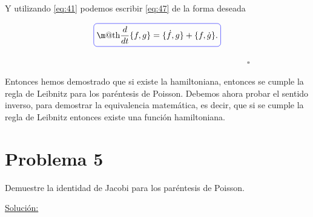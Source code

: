 \documentclass[a4paper,10pt]{article}
\makeatletter
\numberwithin{equation}{section}
\newcommand*{\boxcolor}{blue}
\renewcommand{\boxed}[1]{\textcolor{\boxcolor}{%
\tikz[baseline={([yshift=-1ex]current bounding box.center)}] \node [rectangle, minimum width=1ex,rounded corners,draw] {\normalcolor\m@th$\displaystyle#1$};}}
\makeatother
\begin{document}
Y utilizando \eqref{eq:41} podemos escribir \eqref{eq:47} de la forma deseada

\begin{equation}
 \boxed{\frac{d}{dt}\{f,g\} = \{\dot{f},g\} + \{f,\dot{g}\}.}
\end{equation}

$\hspace{12cm} \square$

Entonces hemos demostrado que si existe la hamiltoniana, entonces se cumple la regla 
de Leibnitz para los paréntesis de Poisson. Debemos ahora probar el sentido inverso, 
para demostrar la equivalencia matemática, es decir, que si se cumple la regla de 
Leibnitz entonces existe una función hamiltoniana.







\section{Problema 5}

Demuestre la identidad de Jacobi para los paréntesis de Poisson.

\vspace{.3cm}

\underline{Solución:} \vspace{.3cm}
\end{document}
